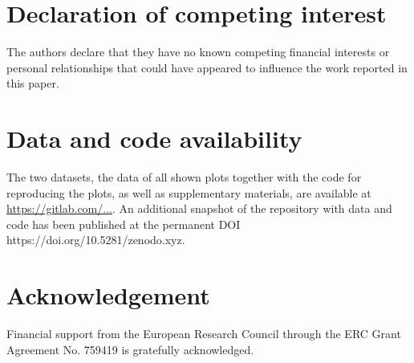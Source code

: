 \documentclass[11pt, authoryear]{elsarticle}
\begin{document}
	\section*{Declaration of competing interest}\noindent
	The authors declare that they have no known competing financial interests or personal relationships that could have appeared to influence the work reported in this paper.
	
	\section*{Data and code availability}\noindent
	The two datasets, the data of all shown plots together with the code for reproducing
	the plots, as well as supplementary materials, are available at 
	\url{https://gitlab.com/...}. An additional snapshot of the repository 
	with data and code has been published at the
	permanent DOI https://doi.org/10.5281/zenodo.xyz.
	
	\section*{Acknowledgement}\noindent
	Financial support from the European Research Council through the ERC Grant 
	Agreement No. 759419 is gratefully acknowledged.
	\bigskip\bigskip
	
\end{document}
